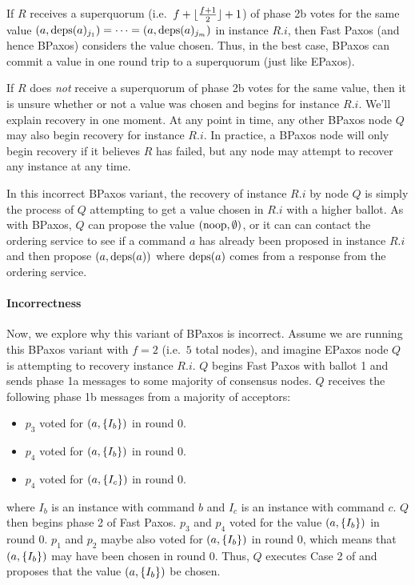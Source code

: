If $R$ receives a superquorum (i.e.\ $f + \lfloor\frac{f+1}{2}\rfloor + 1$) of phase
2b votes for the same value $(a, \text{deps}(a)_{j_1}) = \cdots = (a,
\text{deps}(a)_{j_m})$ in instance $R.i$, then Fast Paxos (and hence BPaxos)
considers the value chosen. Thus, in the best case, BPaxos can commit a value
in one round trip to a superquorum (just like EPaxos).

If $R$ does \emph{not} receive a superquorum of phase 2b votes for the same
value, then it is unsure whether or not a value was chosen and begins
 for instance $R.i$. We'll explain recovery in one moment. At
any point in time, any other BPaxos node $Q$ may also begin recovery for
instance $R.i$. In practice, a BPaxos node will only begin recovery if it
believes $R$ has failed, but any node may attempt to recover any instance at
any time.

In this incorrect BPaxos variant, the recovery of instance $R.i$ by node $Q$ is
simply the process of $Q$ attempting to get a value chosen in $R.i$ with a
higher ballot. As with BPaxos, $Q$ can propose the value $(\text{noop}, \emptyset)$,
or it can can contact the ordering service to see if a command $a$ has already
been proposed in instance $R.i$ and then propose $(a, \text{deps}(a))$ where
$\text{deps}(a)$ comes from a response from the ordering service.

\paragraph{Incorrectness}
Now, we explore why this variant of BPaxos is incorrect. Assume we are running
this BPaxos variant with $f = 2$ (i.e.\ $5$ total nodes), and imagine EPaxos
node $Q$ is attempting to recovery instance $R.i$. $Q$ begins Fast Paxos with
ballot 1 and sends phase 1a messages to some majority of consensus nodes. $Q$
receives the following phase 1b messages from a majority of acceptors:
\begin{itemize}
  \item
    $p_3$ voted for $(a, \{I_b\})$ in round $0$.
  \item
    $p_4$ voted for $(a, \{I_b\})$ in round $0$.
  \item
    $p_4$ voted for $(a, \{I_c\})$ in round $0$.
\end{itemize}
where $I_b$ is an instance with command $b$ and $I_c$ is an instance with
command $c$.
%
$Q$ then begins phase 2 of Fast Paxos. $p_3$ and $p_4$ voted for the value $(a,
\{I_b\})$ in round $0$. $p_1$ and $p_2$ maybe also voted for $(a, \{I_b\})$
in round $0$, which means that $(a, \{I_b\})$ may have been chosen in round
$0$. Thus, $Q$ executes Case 2 of  and proposes that
the value $(a, \{I_b\})$ be chosen.

